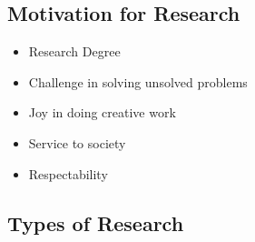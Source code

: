 \documentclass{article}
\begin{document}
\subsection{Motivation for Research}

\begin{itemize}
    \item Research Degree
    \item Challenge in solving unsolved problems
    \item Joy in doing creative work
    \item Service to society
    \item Respectability
\end{itemize}

\subsection{Types of Research}
\end{document}
